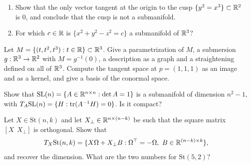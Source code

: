 \begin{notechapter}
\begin{exercise}\label{submanifolds:exr:2}
\begin{enumerate}[nosep]
  \item Show that the only vector tangent at the origin to the cusp
        $\{y^2 = x^3\}\subset\mathbb{R}^2$ is $0$, and conclude that the cusp is
        not a submanifold.
  \item For which $c\in\mathbb{R}$ is $\{x^2 + y^2 - z^2 = c\}$ a submanifold of
        $\mathbb{R}^3$?
\end{enumerate}
\end{exercise}

\begin{exercise}\label{submanifolds:exr:3}
Let $M = \{(t, t^2, t^3) : t\in\mathbb{R}\}\subset\mathbb{R}^3$. Give a parametrization
of $M$, a submersion $g:\mathbb{R}^3\to\mathbb{R}^2$ with $M = g^{-1}(0)$, a description
as a graph and a straightening defined on all of $\mathbb{R}^3$. Compute the
tangent space at $p = (1, 1, 1)$ as an image and as a kernel, and give a
basis of the conormal space.
\end{exercise}

\begin{exercise}\label{submanifolds:exr:4}
Show that $\mathrm{SL}(n) = \{A\in\mathbb{R}^{n\times n} : \det A = 1\}$ is a
submanifold of dimension $n^2 - 1$, with
$T_A\mathrm{SL}(n) = \{H : \operatorname{tr}(A^{-1}H) = 0\}$. Is it compact?
\end{exercise}

\begin{exercise}\label{submanifolds:exr:5}
Let $X\in\mathrm{St}(n, k)$ and let $X_\perp\in\mathbb{R}^{n\times(n - k)}$ be
such that the square matrix $[X\ \ X_\perp]$ is orthogonal. Show that
\[
  T_X\mathrm{St}(n, k)
  = \{X\Omega + X_\perp B : \Omega^\top = -\Omega,\
      B\in\mathbb{R}^{(n - k)\times k}\} ,
\]
and recover the dimension. What are the two numbers for
$\mathrm{St}(5, 2)$?
\end{exercise}


\end{notechapter}
